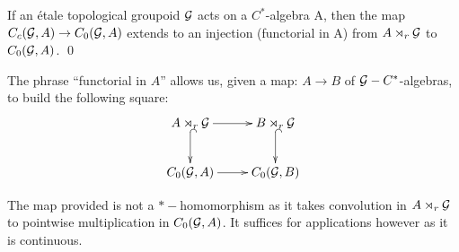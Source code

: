 \begin{conjecture}
{\begin{lemma}\label{Lem:Lemma9}
If an \'etale topological groupoid $\mathcal{G}$ acts on a $C^{*}$-algebra A, then the map $C_{c}(\mathcal{G},A) \rightarrow C_{0}(\mathcal{G},A)$ extends to an injection (functorial in A) from $A\rtimes_{r} \mathcal{G}$ to $C_{0}(\mathcal{G},A)$. \qed
\end{lemma}

\begin{remark}
The phrase ``functorial in $A$'' allows us, given a map: $A \rightarrow B$ of $\mathcal{G}-C^{*}$-algebras, to build the following square:
\begin{equation*}
\xymatrix{A\rtimes_{r} \G \ar@{->}[r] \ar@{^{(}->}[d] &B \rtimes_{r} \G \ar@{^{(}->}[d]\\
C_{0}(\G ,A)\ar@{->}[r] &   C_{0}(\G ,B)
}
\end{equation*}
\end{remark}

\begin{remark}
The map provided is not a $*-$homomorphism as it takes convolution in $A\rtimes_{r} \mathcal{G}$ to pointwise multiplication in $C_{0}(\mathcal{G},A)$. It suffices for applications however as it is continuous.
\end{remark}

}
\end{conjecture}
